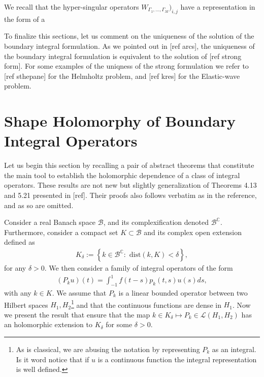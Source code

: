 \documentclass{article}
\newcommand{\todo}[1]{{\color{red}[#1]}}
\newcommand{\IC}{{\mathbb C}}
\begin{document}
We recall that the hyper-singular operators $ W_{\Gamma_1,\hdots,\Gamma_M})_{i,j}$ have a representation in the form of a 

To finalize this sections, let us comment on the uniqueness of the solution of the boundary integral formulation. As we pointed out in \todo{ref arcs}, the uniqueness of the boundary integral formulation is equivalent to the solution of \todo{ref strong form}. For some examples of the uniqness of the strong formulation we refer to \todo{ref sthepane} for the Helmholtz problem, and \todo{ref kres} for the Elastic-wave problem.
\section{Shape Holomorphy of Boundary Integral Operators}

Let us begin this section by recalling a pair of abstract theorems that constitute the main tool to establish the holomorphic dependence of a class of integral operators. These results are not new but slightly generalization of  Theorems 4.13 and 5.21 presented in \todo{ref}. Their proofs also follows verbatim as in the reference, and as so are omitted.

Consider a real Banach space $\mathcal{B}$, and its complexification denoted $\mathcal{B}^{\IC}$. Furthermore, consider a compact set $K \subset \mathcal{B}$ and its complex open extension defined as 
\begin{align}
\label{eq:openext}
K_\delta :=  \left\lbrace k \in \mathcal{B}^{\IC} : \text{ dist}(k, K) < \delta \right\rbrace,
\end{align}
for any $\delta>0$. We then consider a family of integral operators of the form
\begin{align*}
(P_k u)(t) = \int_{-1}^{1} f(t-s) p_k(t,s) u(s) ds,
\end{align*}
with any $k \in K$. We assume that $P_k$ is a linear bounded operator between two Hilbert spaces $H_1,H_2$\footnote{As is classical, we are abusing the notation by representing $P_k$ as an integral. Is it word notice that if $u$ is a continuous function the integral representation is well defined.} and that the continuous functions are dense in $H_1$. Now we present the result that ensure that the map $k \in K_\delta \mapsto P_k \in \mathcal{L}(H_1,H_2)$ has an holomorphic extension to $K_\delta$ for some $\delta>0$. 
\end{document}
